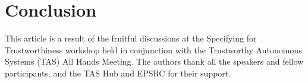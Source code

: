 \documentclass[sigconf]{acmart}
\begin{document}
\section{Conclusion}

\begin{acks}
This article is a result of the fruitful discussions at the Specifying for Trustworthiness workshop held in conjunction with the Trustworthy Autonomous Systems (TAS) All Hands Meeting. The authors thank all the speakers and fellow participants, and the TAS Hub and EPSRC for their support.
\end{acks}



\end{document}
